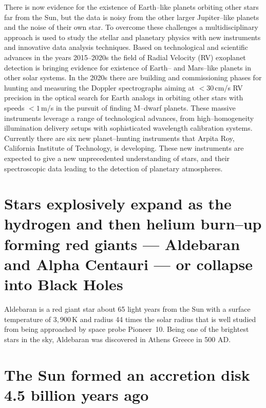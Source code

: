 \documentclass[a4paper,openany,12pt]{book}
\begin{document}
There is now evidence for the existence of Earth--like planets orbiting other stars far from the Sun, but the data is noisy from the other larger Jupiter--like planets and the noise of their own star. To overcome these challenges a multidisciplinary approach is used to study the stellar and planetary physics with new instruments and innovative data analysis techniques. Based on technological and scientific advances in the years 2015--2020s the field of Radial Velocity (RV) exoplanet detection is bringing evidence for existence of Earth-- and Mars--like planets in other solar systems.  In the 2020s there are building and commissioning phases for hunting and measuring the  Doppler spectrographs aiming at $<30\,$cm/s RV precision in the optical search for Earth analogs in orbiting other stars with speeds $<1\,$m/s in the pursuit of finding M--dwarf planets. These massive instruments leverage a range of technological advances, from high--homogeneity illumination delivery setups with sophisticated wavelength calibration systems. Currently there are six new planet--hunting instruments that Arpita Roy, California Institute of Technology, is developing. These new instruments are expected to give a new unprecedented understanding of stars, and their spectroscopic data leading to the detection of planetary atmospheres. 

\section{Stars explosively expand as the hydrogen and then helium burn--up forming red giants --- Aldebaran and Alpha Centauri --- or collapse into Black Holes}

Aldebaran is a red giant star about 65 light years from the Sun with a surface temperature of $3,900\,$K and radius 44 times the solar radius that is well studied from being approached by space probe Pioneer~10. Being one of the brightest stars in the sky, Aldebaran was discovered in Athens Greece in 500 AD.

\section{The Sun formed an accretion disk 4.5 billion years ago}
\end{document}
